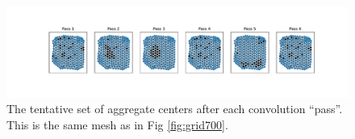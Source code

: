 \documentclass{article}
\newcommand{\abs}[1]{\left\lvert#1\right\rvert}
\newcommand{\mat}[1]{\bm{{#1}}}
\begin{document}
\begin{figure}[h]
  \centering
  \includegraphics[width=\textwidth, trim=130 0 100 0, clip]{agg_passes.pdf}
  \caption{The tentative set of aggregate centers after each convolution ``pass''.  This is the same mesh as in Fig \ref{fig:grid700}.}
  \label{fig:agg_passes}
\end{figure}




\end{document}
